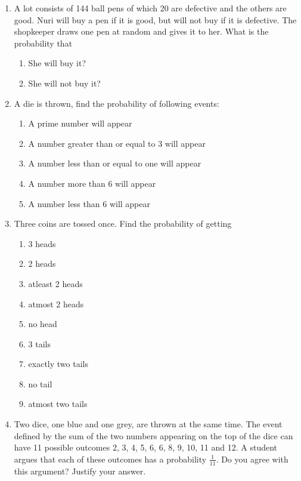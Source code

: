 \begin{enumerate}[label=\thechapter.\arabic*,ref=\thechapter.\theenumi]
	\item A lot consists of 144 ball pens of which 20 are defective and the 
    others are good. Nuri will buy a pen if it is good, but will not buy if it 
    is defective. The shopkeeper draws one pen at random and gives it to her. 
    What is the probability that
    \begin{enumerate}
        \item She will buy it?
        \item She will not buy it?
    \end{enumerate}
\solution

\item A die is thrown, find the probability of following events:
\begin{enumerate}
\item A prime number will appear
\item A number greater than or equal to 3 will appear
\item A number less than or equal to one will appear
\item A number more than 6 will appear
\item A number less than 6 will appear
\end{enumerate}
\solution

  \item Three coins are tossed once. Find the probability of getting 
    \begin{enumerate}
        \item 3 heads
        \item 2 heads
        \item atleast 2 heads 
        \item atmost 2 heads
        \item no head
        \item 3 tails 
        \item exactly two tails
        \item no tail
        \item atmost two tails
    \end{enumerate}
\solution

	\item Two dice, one blue and one grey, are thrown at the same time.   The event defined by the sum of the two numbers appearing on the top of the dice can have 11 possible outcomes 2, 3, 4, 5, 6, 6, 8, 9, 10, 11 and 12.  A student argues that each of these outcomes has a probability $\frac{1}{11}$.  Do you agree with this argument?  Justify your answer.

\end{enumerate}
